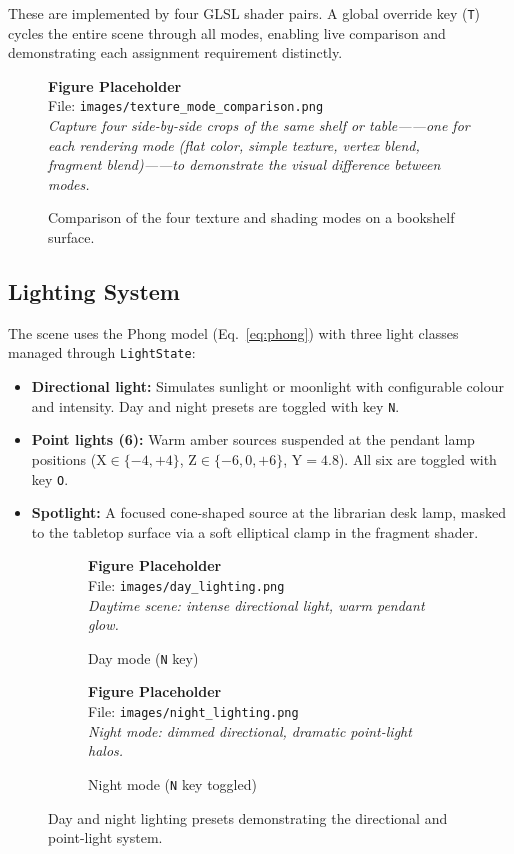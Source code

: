 \documentclass[12pt, a4paper]{article}
\newcommand{\imgph}[2]{%
    \begin{mdframed}[backgroundcolor=lightblue!60, linecolor=sectionblue,
                     linewidth=1pt, roundcorner=4pt, innertopmargin=8pt,
                     innerbottommargin=8pt]
        \centering
        {\bfseries\color{sectionblue} Figure Placeholder}\\[4pt]
        File: \texttt{#1}\\[3pt]
        {\small\itshape #2}
    \end{mdframed}%
}
\begin{document}
These are implemented by four GLSL shader pairs. A global override key (\texttt{T}) cycles the entire scene through all modes, enabling live comparison and demonstrating each assignment requirement distinctly.

\begin{figure}[H]
    \centering
    \imgph{images/texture_mode_comparison.png}{%
        Capture four side-by-side crops of the same shelf or table——one for each rendering mode
        (flat color, simple texture, vertex blend, fragment blend)——to demonstrate the visual
        difference between modes.}
    \caption{Comparison of the four texture and shading modes on a bookshelf surface.}
    \label{fig:texmodes}
\end{figure}

\subsection{Lighting System}

The scene uses the Phong model (Eq.~\ref{eq:phong}) with three light classes managed through \texttt{LightState}:

\begin{itemize}[leftmargin=1.5em]
    \item \textbf{Directional light:} Simulates sunlight or moonlight with configurable colour and intensity. Day and night presets are toggled with key \texttt{N}.
    \item \textbf{Point lights (6):} Warm amber sources suspended at the pendant lamp positions (X$\in\{-4,+4\}$, Z$\in\{-6,0,+6\}$, Y$=4.8$). All six are toggled with key \texttt{O}.
    \item \textbf{Spotlight:} A focused cone-shaped source at the librarian desk lamp, masked to the tabletop surface via a soft elliptical clamp in the fragment shader.
\end{itemize}

\begin{figure}[H]
    \centering
    \begin{subfigure}{0.47\textwidth}
        \imgph{images/day_lighting.png}{Daytime scene: intense directional light, warm pendant glow.}
        \caption{Day mode (\texttt{N} key)}
    \end{subfigure}\hfill
    \begin{subfigure}{0.47\textwidth}
        \imgph{images/night_lighting.png}{Night mode: dimmed directional, dramatic point-light halos.}
        \caption{Night mode (\texttt{N} key toggled)}
    \end{subfigure}
    \caption{Day and night lighting presets demonstrating the directional and point-light system.}
    \label{fig:lighting}
\end{figure}
\end{document}
